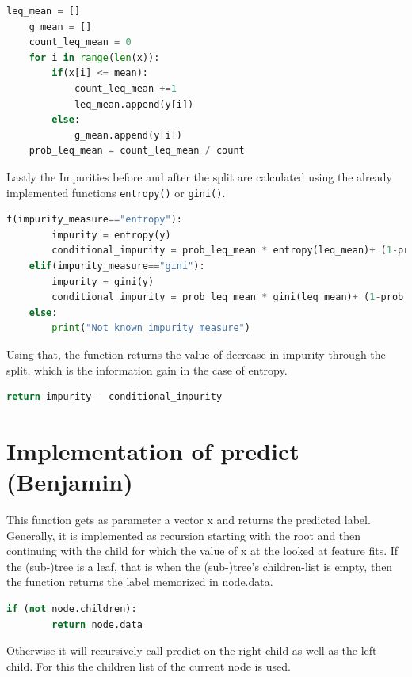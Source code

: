 \documentclass[12pt,a4paper]{scrartcl}		%
\begin{document}
\begin{lstlisting}[language=Python]
    leq_mean = []
    g_mean = []
    count_leq_mean = 0
    for i in range(len(x)):
        if(x[i] <= mean):
            count_leq_mean +=1
            leq_mean.append(y[i])
        else:
            g_mean.append(y[i])
    prob_leq_mean = count_leq_mean / count
\end{lstlisting}

Lastly the Impurities before and after the split are calculated using the already implemented functions 
\texttt{entropy()} or \texttt{gini()}.

\begin{lstlisting}[language=Python]
    f(impurity_measure=="entropy"):
        impurity = entropy(y)
        conditional_impurity = prob_leq_mean * entropy(leq_mean)+ (1-prob_leq_mean) * entropy(g_mean)
    elif(impurity_measure=="gini"):
        impurity = gini(y)
        conditional_impurity = prob_leq_mean * gini(leq_mean)+ (1-prob_leq_mean) * gini(g_mean) 
    else:
        print("Not known impurity measure")

\end{lstlisting}

Using that, the function returns the value of decrease in impurity through the split, which is the 
information gain in the case of entropy.
 
\begin{lstlisting}[language=Python]
    return impurity - conditional_impurity
\end{lstlisting}

\section{Implementation of predict (Benjamin)}
This function gets as parameter a vector x and returns the predicted label. Generally, it is implemented as 
recursion starting with the root and then continuing with the child for which the value of x at the looked 
at feature fits. 
If the (sub-)tree is a leaf, that is when the (sub-)tree’s children-list is empty, then the function returns 
the label memorized in node.data. 

\begin{lstlisting}[language=Python]
    if (not node.children):
        return node.data
\end{lstlisting}
 
Otherwise it will recursively call predict on the right child as well as the left child.
For this the children list of the current node is used.
\end{document}
